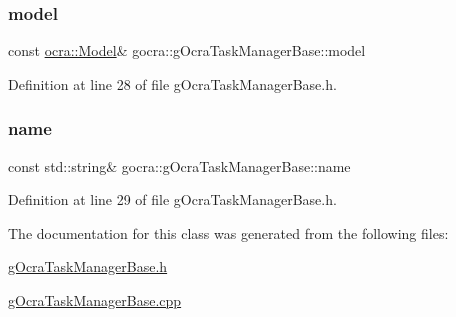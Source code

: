 \hypertarget{classgocra_1_1gOcraTaskManagerBase_adc439e7170f7120611fc6d009d06404e}{}\label{classgocra_1_1gOcraTaskManagerBase_adc439e7170f7120611fc6d009d06404e} 
\subsubsection{\texorpdfstring{model}{model}}
{\footnotesize\ttfamily const \hyperlink{classocra_1_1Model}{ocra\+::\+Model}\& gocra\+::g\+Ocra\+Task\+Manager\+Base\+::model\hspace{0.3cm}{\ttfamily [protected]}}



Definition at line 28 of file g\+Ocra\+Task\+Manager\+Base.\+h.

\hypertarget{classgocra_1_1gOcraTaskManagerBase_adfda0d31ecfa9afea1380f076a472f37}{}\label{classgocra_1_1gOcraTaskManagerBase_adfda0d31ecfa9afea1380f076a472f37} 
\subsubsection{\texorpdfstring{name}{name}}
{\footnotesize\ttfamily const std\+::string\& gocra\+::g\+Ocra\+Task\+Manager\+Base\+::name\hspace{0.3cm}{\ttfamily [protected]}}



Definition at line 29 of file g\+Ocra\+Task\+Manager\+Base.\+h.



The documentation for this class was generated from the following files\+:\begin{DoxyCompactItemize}
\item 
\hyperlink{gOcraTaskManagerBase_8h}{g\+Ocra\+Task\+Manager\+Base.\+h}\item 
\hyperlink{gOcraTaskManagerBase_8cpp}{g\+Ocra\+Task\+Manager\+Base.\+cpp}\end{DoxyCompactItemize}
